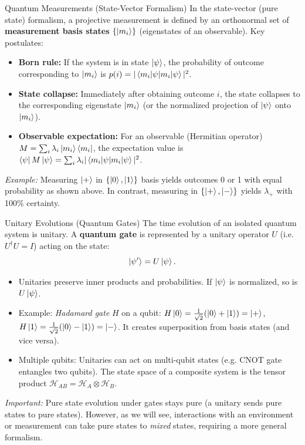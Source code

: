 \begin{frame}{Quantum Measurements (State-Vector Formalism)}
  In the state-vector (pure state) formalism, a projective measurement is defined by an orthonormal set of \textbf{measurement basis states} $\{\ket{m_i}\}$ (eigenstates of an observable). Key postulates:
  \begin{itemize}
    \item \textbf{Born rule:} If the system is in state $\ket{\psi}$, the probability of outcome corresponding to $\ket{m_i}$ is $p(i) = |\braket{m_i|\psi}|^2$.
    \item \textbf{State collapse:} Immediately after obtaining outcome $i$, the state collapses to the corresponding eigenstate $\ket{m_i}$ (or the normalized projection of $\ket{\psi}$ onto $\ket{m_i}$).
    \item \textbf{Observable expectation:} For an observable (Hermitian operator) $M = \sum_i \lambda_i \ket{m_i}\bra{m_i}$, the expectation value is $\bra{\psi}M\ket{\psi} = \sum_i \lambda_i |\braket{m_i|\psi}|^2$.
  \end{itemize}
  \vspace{1ex}
  \textit{Example:} Measuring $\ket{+}$ in $\{\ket{0},\ket{1}\}$ basis yields outcomes 0 or 1 with equal probability as shown above. In contrast, measuring in $\{\ket{+},\ket{-}\}$ yields $\lambda_{+}$ with 100\% certainty.
\end{frame}

\begin{frame}{Unitary Evolutions (Quantum Gates)}
  The time evolution of an isolated quantum system is unitary. A \textbf{quantum gate} is represented by a unitary operator $U$ (i.e. $U^\dagger U = I$) acting on the state:
  \[
    \ket{\psi'} = U \ket{\psi}.
  \]
  \begin{itemize}
    \item Unitaries preserve inner products and probabilities. If $\ket{\psi}$ is normalized, so is $U\ket{\psi}$.
    \item Example: \textit{Hadamard gate} $H$ on a qubit: 
      $H\ket{0} = \frac{1}{\sqrt{2}}(\ket{0}+\ket{1}) = \ket{+}$, 
      $H\ket{1} = \frac{1}{\sqrt{2}}(\ket{0}-\ket{1}) = \ket{-}$. 
      It creates superposition from basis states (and vice versa).
    \item Multiple qubits: Unitaries can act on multi-qubit states (e.g. CNOT gate entangles two qubits). The state space of a composite system is the tensor product $\mathcal{H}_{AB} = \mathcal{H}_A \otimes \mathcal{H}_B$.
  \end{itemize}
  \textit{Important:} Pure state evolution under gates stays pure (a unitary sends pure states to pure states). However, as we will see, interactions with an environment or measurement can take pure states to \emph{mixed} states, requiring a more general formalism.
\end{frame}

